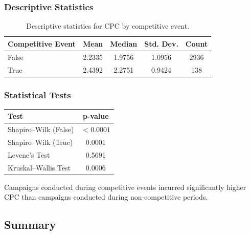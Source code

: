 \subsubsection{Descriptive Statistics}

\begin{table}[H]
	\centering
	\caption{Descriptive statistics for CPC by competitive event.}
	\begin{tabular}{lcccc}
		\toprule
		Competitive Event & Mean & Median & Std. Dev. & Count\\
		\midrule
		False & 2.2335 & 1.9756 & 1.0956 & 2936\\
		True  & 2.4392 & 2.2751 & 0.9424 & 138\\
		\bottomrule
	\end{tabular}
\end{table}

\subsubsection{Statistical Tests}

\begin{table}[H]
	\centering
	\begin{tabular}{lc}
		\toprule
		Test & p-value\\
		\midrule
		Shapiro--Wilk (False) & $<0.0001$\\
		Shapiro--Wilk (True) & 0.0001\\
		Levene's Test & 0.5691\\
		Kruskal--Wallis Test & 0.0006\\
		\bottomrule
	\end{tabular}
\end{table}

Campaigns conducted during competitive events incurred significantly higher CPC than campaigns conducted during non-competitive periods.

\vspace{0.3cm}

\subsection{Summary}

